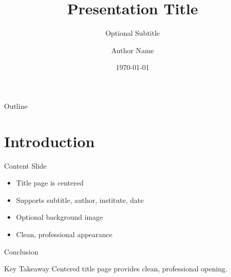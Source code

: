 \documentclass[10pt]{beamer}
\title[]{Presentation Title}
\subtitle{Optional Subtitle}
\author[]{Author Name}
\institute[]{Institution Name}
\date{\today}
\begin{document}
\begin{frame}
  \titlepage
\end{frame}

\begin{frame}{Outline}
  \tableofcontents
\end{frame}

\section{Introduction}

\begin{frame}{Content Slide}
  \begin{itemize}
    \item Title page is centered
    \item Supports subtitle, author, institute, date
    \item Optional background image
    \item Clean, professional appearance
  \end{itemize}
\end{frame}

\begin{frame}{Conclusion}
  \begin{block}{Key Takeaway}
    Centered title page provides clean, professional opening.
  \end{block}
\end{frame}
\end{document}
